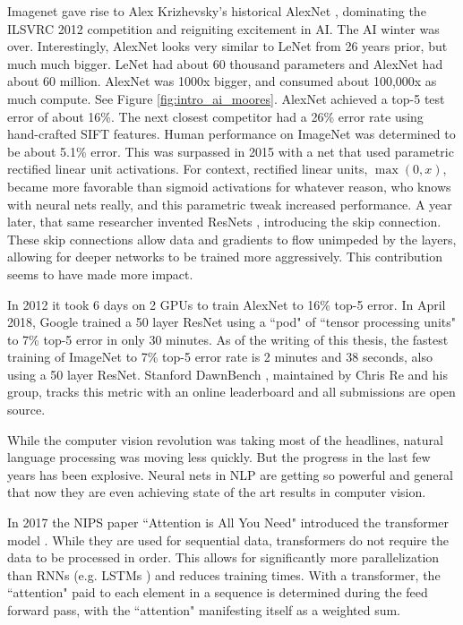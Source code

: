 Imagenet gave rise to Alex Krizhevsky's historical AlexNet \cite{krizhevsky2012imagenet}, dominating the ILSVRC 2012 competition and reigniting excitement in AI.  The AI winter was over.  Interestingly, AlexNet looks very similar to LeNet from 26 years prior, but much much bigger.  LeNet had about 60 thousand parameters and AlexNet had about 60 million.  AlexNet was 1000x bigger, and consumed about 100,000x as much compute.  See Figure \ref{fig:intro_ai_moores}.  AlexNet achieved a top-5 test error of about 16\%.  The next closest competitor had a 26\% error rate using hand-crafted SIFT features.  Human performance on ImageNet was determined to be about 5.1\% error.  This was surpassed in 2015 \cite{he2015delving} with a net that used parametric rectified linear unit activations.  For context, rectified linear units, $\max(0, x)$, became more favorable than sigmoid activations for whatever reason, who knows with neural nets really, and this parametric tweak increased performance.  A year later, that same researcher invented ResNets \cite{he2016deep}, introducing the skip connection.  These skip connections allow data and gradients to flow unimpeded by the layers, allowing for deeper networks to be trained more aggressively.  This contribution seems to have made more impact.

In 2012 it took 6 days on 2 GPUs to train AlexNet to 16\% top-5 error.  In April 2018, Google trained a 50 layer ResNet using a ``pod" of ``tensor processing units" to 7\% top-5 error in only 30 minutes.  As of the writing of this thesis, the fastest training of ImageNet to 7\% top-5 error rate is 2 minutes and 38 seconds, also using a 50 layer ResNet.  Stanford DawnBench \cite{coleman2017dawnbench}, maintained by Chris Re and his group, tracks this metric with an online leaderboard and all submissions are open source.

While the computer vision revolution was taking most of the headlines, natural language processing was moving less quickly.  But the progress in the last few years has been explosive.  Neural nets in NLP are getting so powerful and general that now they are even achieving state of the art results in computer vision.

In 2017 the NIPS paper ``Attention is All You Need" introduced the transformer model \cite{vaswani2017attention}.  While they are used for sequential data, transformers do not require the data to be processed in order. This allows for significantly more parallelization than RNNs (e.g. LSTMs \cite{hochreiter1997long}) and reduces training times.  With a transformer, the ``attention" paid to each element in a sequence is determined during the feed forward pass, with the ``attention" manifesting itself as a weighted sum.

